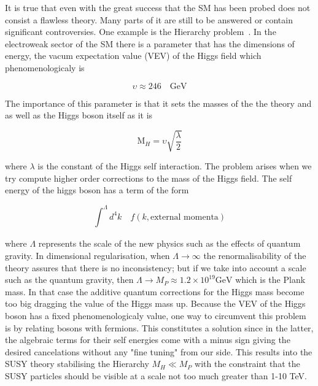 \documentclass[12pt,a4paper]{report}
\begin{document}
It is true that even with the great success that the SM has been probed does not consist a flawless theory.
Many parts of it are still to be answered or contain significant controversies. One example is the Hierarchy 
problem~\cite{aitchison2005supersymmetry}. 
In the electroweak sector of the SM there is a parameter that has the dimensions of energy, the 
vacum expectation value (VEV) of the Higgs field which phenomenologicaly is 

\begin{equation}
 \upsilon \approx 246 \quad \textrm{GeV}
\end{equation}

The importance of this parameter is that it sets the masses of the the theory and as well as the Higgs boson
itself as it is

\begin{equation}
 \textrm{M}_{H} = \upsilon \sqrt{\frac{\lambda}{2}} 
\end{equation}


where $\lambda$ is the constant of the Higgs self interaction. The problem arises when we try compute higher 
order corrections to the mass of the Higgs field. The self energy of the higgs boson has a term of the form

\begin{equation}
 \int_{}^{\Lambda} d^{4}k \quad f(k,\textrm{external momenta})
\end{equation}

where $\Lambda$ represents the scale of the new physics such as the effects of quantum gravity. In dimensional 
regularisation, when $\Lambda \rightarrow \infty$ the renormalisability of the theory assures that there
is no inconsistency; but if we take into account a scale such as the quantum gravity, then $\Lambda \rightarrow 
M_{P} \approx 1.2\times 10^{19} \textrm{GeV}$ which is the Plank mass. In that case 
the additive quantum corrections for the Higgs 
mass become too big dragging the value of the Higgs mass up. Because the VEV of the Higgs boson has a fixed 
phenomenologicaly value, one way to circumvent this problem is by relating bosons with fermions. 
This constitutes a solution since in the 
latter, the algebraic terms for their self energies come with a minus sign giving the desired cancelations 
without any "fine tuning" from our side. This results into the SUSY theory stabilising the Hierarchy $M_{H}
\ll M_{P}$ with the constraint that the SUSY particles should be visible at a scale not too much greater 
than 1-10 TeV.
\end{document}
